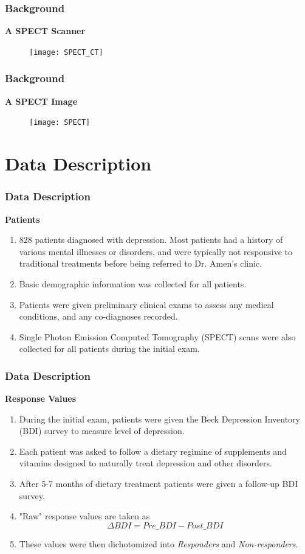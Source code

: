 \documentclass{beamer}
\begin{document}
\begin{frame}
\frametitle{Background}
\textbf{A SPECT Scanner}
\begin{center}
\begin{figure}
\texttt{[image: SPECT\_CT]}
\end{figure}
\end{center}
\end{frame}

\begin{frame}
\frametitle{Background}
\textbf{A SPECT Image}
\begin{center}
\begin{figure}
\texttt{[image: SPECT]}
\end{figure}
\end{center}
\end{frame}

\section{Data Description}

\begin{frame}
\frametitle{Data Description}
\textbf{Patients}
\begin{enumerate}
\item 828 patients diagnosed with depression.  Most patients had a history of various mental illnesses or disorders, and were typically not responsive to traditional treatments before being referred to Dr. Amen's clinic.
\item Basic demographic information was collected for all patients.
\item Patients were given preliminary clinical exams to assess any medical conditions, and any co-diagnoses recorded.
\item Single Photon Emission Computed Tomography (SPECT) scans were also collected for all patients during the initial exam.
\end{enumerate}
\end{frame}

\begin{frame}
\frametitle{Data Description}
\textbf{Response Values}
\begin{enumerate}
\item  During the initial exam, patients were given the Beck Depression Inventory (BDI) survey to measure level of depression.
\item Each patient was asked to follow a dietary regimine of supplements and vitamins designed to naturally treat depression and other disorders.
\item After 5-7 months of dietary treatment patients were given a follow-up BDI survey.
\item "Raw" response values are taken as 
\[\Delta\textit{BDI} = \textit{Pre\_BDI} - \textit{Post\_BDI}\]
\item These values were then dichotomized into \textit{Responders} and \textit{Non-responders}.
\end{enumerate}
\end{frame}
\end{document}
